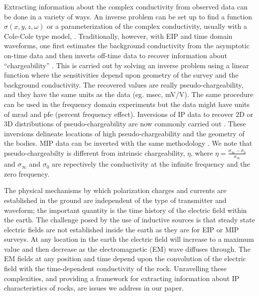 \documentclass[extra,mreferee]{gji}
\newcommand{\siginf}{\sigma_\infty}
\begin{document}
Extracting information about the complex conductivity from observed data can be done in a variety of ways. An inverse problem can be set up to find a function $\sigma(x,y,z,\omega)$ or a parameterization of the complex conductivity, usually with a Cole-Cole type model, \cite[]{Fiandaca2012, Marchant2013,Xu2013}. Traditionally, however, with EIP and time domain waveforms, one first estimates the background conductivity from the asymptotic on-time data and then inverts off-time data to recover information about ``chargeability'' \cite[]{doug1994}. This is carried out by solving an inverse problem using a linear function where the sensitivities depend upon geometry of the survey and the background conductivity. The recovered values are really pseudo-chargeability, and they have the same units as the data (eg. msec, mV/V). The same procedure can be used in the frequency domain experiments but the data might have units of mrad and pfe (percent frequency effect). Inversions of IP data to recover 2D or 3D distributions of pseudo-chargeability are now commonly carried out \cite[]{Kemna2012}. These inversions delineate locations of high pseudo-chargeability and the geometry of the bodies. MIP data can be inverted with the same methodology \cite[]{Chen2003}. We note that pseudo-chargeabilty is different from intrinsic chargeability, $\eta$, where $\eta = \frac{\siginf-\sigma_0}{\siginf}$ and $\siginf$ and $\sigma_0$ are repectively the conductivity at the infinite frequency and the zero frequency.

The physical mechanisms by which polarization charges and currents are established in the ground are independent of the type of transmitter and waveform; the important quantity is the time history of the electric field within the earth. The challenge posed by the use of inductive sources is that steady state electric fields are not established inside the earth as they are for EIP or MIP surveys. At any location in the earth the electric field will increase to a maximum value and then decrease as the electromagnetic (EM) wave diffuses through. The EM fields at any position and time depend upon the convolution of the electric field with the time-dependent conductivity of the rock. Unravelling these complexities, and providing a framework for extracting information about IP characteristics of rocks, are issues we address in our paper.
\end{document}
